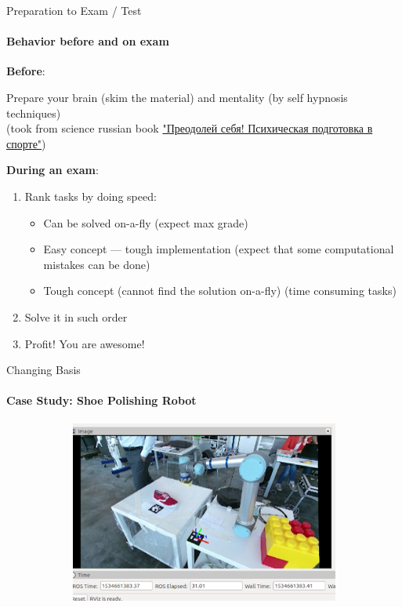 \documentclass[aspectratio=169]{beamer}
\begin{document}
\begin{frame}[t]{Preparation to Exam / Test}
    \vspace{-0.5cm}
    \framesubtitle{Behavior before and on exam}
    \textbf{Before}:

    Prepare your brain (skim the material) and mentality (by self hypnosis techniques) \\ (took from science russian book \href{https://yadi.sk/d/uZhNSQW637Q3v7}{"Преодолей себя! Психическая подготовка в спорте"}) \smallskip

    \textbf{During an exam}:
    \begin{enumerate}
        \item Rank tasks by doing speed: \begin{itemize}
                  \item Can be solved on-a-fly (expect max grade)
                  \item Easy concept --- tough implementation (expect that some computational mistakes can be done)
                  \item Tough concept (cannot find the solution on-a-fly) (time consuming tasks)
              \end{itemize}
        \item Solve it in such order
        \item Profit! You are awesome!
    \end{enumerate}
\end{frame}

\begin{frame}[t]{Changing Basis}
    \framesubtitle{Case Study: Shoe Polishing Robot}
    \vspace{-0.6cm}
    \begin{figure}[H]
        \centering\includegraphics[height=6cm,width=1\textwidth,keepaspectratio]{change_basis_practice_2.png}
        \label{fig:change_basis_practice_2.png}
    \end{figure}
\end{frame}
\end{document}
